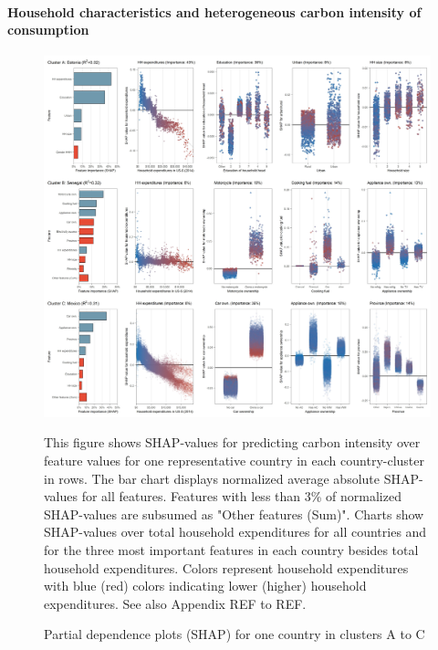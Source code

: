 \documentclass[12pt, a4paper]{article}
\newenvironment{subcaption}
{\strut
\vspace{-5pt}
\begin{minipage}[b]{0.9\textwidth}
  \hspace*{-\parindent}
  \footnotesize}
 {\end{minipage}}
\begin{document}
\paragraph{Household characteristics and heterogeneous carbon intensity of consumption}

\begin{figure}[ht!]
    \centering
    \includegraphics[width=15.5 cm]{Figure 5/Figures_joint_1}
    \caption{Partial dependence plots (SHAP) for one country in clusters A to C}
    \label{fig:fig_5_1}
    \begin{subcaption}
    This figure shows SHAP-values for predicting carbon intensity over feature values for one representative country in each country-cluster in rows. The bar chart displays normalized average absolute SHAP-values for all features. Features with less than 3\% of normalized SHAP-values are subsumed as "Other features (Sum)". Charts show SHAP-values over total household expenditures for all countries and for the three most important features in each country besides total household expenditures. Colors represent household expenditures with blue (red) colors indicating lower (higher) household expenditures. See also Appendix REF to REF.
    \end{subcaption}
\end{figure}
\end{document}
